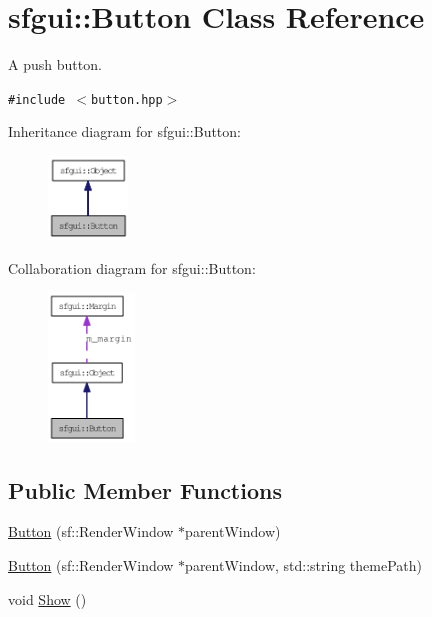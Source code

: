 \hypertarget{classsfgui_1_1Button}{
\section{sfgui::Button Class Reference}
\label{classsfgui_1_1Button}
}
A push button.  


{\tt \#include $<$button.hpp$>$}

Inheritance diagram for sfgui::Button:\nopagebreak
\begin{figure}[H]
\begin{center}
\leavevmode
\includegraphics[width=60pt]{classsfgui_1_1Button__inherit__graph}
\end{center}
\end{figure}
Collaboration diagram for sfgui::Button:\nopagebreak
\begin{figure}[H]
\begin{center}
\leavevmode
\includegraphics[width=65pt]{classsfgui_1_1Button__coll__graph}
\end{center}
\end{figure}
\subsection*{Public Member Functions}
\begin{CompactItemize}
\item 
\hyperlink{classsfgui_1_1Button_05c78461b775a073bed1e218586defd7}{Button} (sf::RenderWindow $\ast$parentWindow)
\item 
\hyperlink{classsfgui_1_1Button_5189b70c8f868718f79c7e119e0b9b32}{Button} (sf::RenderWindow $\ast$parentWindow, std::string themePath)
\item 
void \hyperlink{classsfgui_1_1Button_94dc6919349ff5ca9f334cce78afbe39}{Show} ()
\end{CompactItemize}
